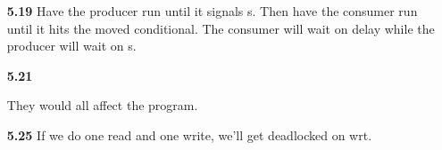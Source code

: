 \documentclass{article}
\begin{document}
\begin{enumerate}
\item[\textbf{5.19}]
Have the producer run until it signals s. Then have the consumer run until it
hits the moved conditional.  The consumer will wait on delay while the producer
will wait on s.

\item[\textbf{5.21}]
\begin{enumerate}
 They would all affect the program.
\end{enumerate}

\item[\textbf{5.25}]
If we do one read and one write, we'll get deadlocked on wrt.

\end{enumerate}
\end{document}

